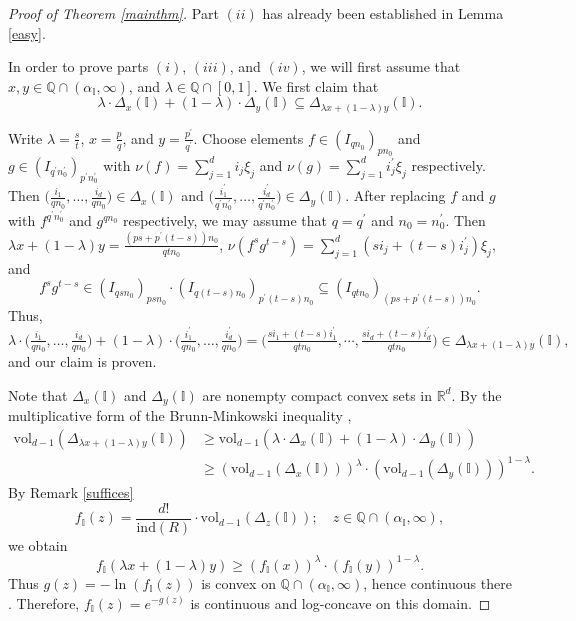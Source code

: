 \documentclass[12pt,a4paper]{amsart}
\theoremstyle{plain}
\theoremstyle{definition}
\numberwithin{equation}{theorem}
\begin{document}
\begin{proof}[Proof of Theorem \ref{mainthm}]
Part $(ii)$ has already been established in Lemma \ref{easy}.

In order to prove parts $(i)$, $(iii)$, and $(iv)$, we will first assume that $x,y\in \mathbb{Q} \cap (\alpha_{\mathbb{I}},\infty)$, and $\lambda \in \mathbb{Q}\cap [0,1]$. We first claim that $$\lambda \cdot \Delta_x(\mathbb{I}) + (1-\lambda)\cdot \Delta_y(\mathbb{I}) \subseteq \Delta_{\lambda x + (1-\lambda)y}(\mathbb{I}).$$

Write $\lambda = \tfrac{s}{t}$, $x=\tfrac{p}{q}$, and $y=\tfrac{p^{\prime}}{q^{\prime}}$. Choose elements $f\in {(I_{qn_0})}_{pn_0}$ and $g\in {(I_{q^{\prime}n_0^{\prime}})}_{p^{\prime}n_0^{\prime}}$ with $\nu(f)=\sum_{j=1}^d i_j\xi_j$ and $\nu(g)=\sum_{j=1}^d i_j^{\prime}\xi_j$ respectively. Then $\big(\tfrac{i_1}{qn_0},\ldots,\tfrac{i_d}{qn_0}\big) \in \Delta_x(\mathbb{I})$ and $\big(\tfrac{i_1^{\prime}}{q^{\prime}n_0^{\prime}},\ldots,\tfrac{i_d^{\prime}}{q^{\prime}n_0^{\prime}}\big) \in \Delta_y(\mathbb{I})$. After replacing $f$ and $g$ with $f^{q^{\prime}n_0^{\prime}}$ and $g^{qn_0}$ respectively, we may assume that $q=q^{\prime}$ and $n_0=n_0^{\prime}$. Then $\lambda x + (1-\lambda)y = \tfrac{(ps+p^{\prime}(t-s))n_0}{qtn_0}$, $\nu(f^sg^{t-s}) = \sum_{j=1}^d \left(si_j+(t-s)i_j^{\prime}\right)\xi_j$, and $$f^sg^{t-s} \in {\left(I_{qsn_0}\right)}_{psn_0}\cdot {\left(I_{q(t-s)n_0}\right)}_{p^{\prime}(t-s)n_0}\subseteq  {\left(I_{qtn_0}\right)}_{(ps+p^{\prime}(t-s))n_0}.$$
Thus,
$$\lambda\cdot\big(\tfrac{i_1}{qn_0},\ldots,\tfrac{i_d}{qn_0}\big) + (1-\lambda)\cdot\big(\tfrac{i_1^{\prime}}{qn_0},\ldots,\tfrac{i_d^{\prime}}{qn_0}\big) = \big(\tfrac{si_1+(t-s)i_1^{\prime}}{qtn_0}, \cdots, \tfrac{si_d+(t-s)i_d^{\prime}}{qtn_0}\big) \in \Delta_{\lambda x + (1-\lambda)y}(\mathbb{I}),$$ and our claim is proven.

Note that $\Delta_x(\mathbb{I})$ and $\Delta_y(\mathbb{I})$ are nonempty compact convex sets in $\mathbb{R}^d$. By the multiplicative form of the Brunn-Minkowski inequality \cite[Theorem 8.2]{Gru07},
\begin{align*}
 \mathrm{vol}_{d-1}\left(\Delta_{\lambda x + (1-\lambda)y}(\mathbb{I})\right) &\geq \mathrm{vol}_{d-1}\left(\lambda\cdot \Delta_x(\mathbb{I}) + (1-\lambda)\cdot \Delta_y(\mathbb{I})\right)\\
 &\geq {\left(\mathrm{vol}_{d-1}\left(\Delta_x(\mathbb{I})\right)\right)}^{\lambda}\cdot {\left(\mathrm{vol}_{d-1}\left(\Delta_y(\mathbb{I})\right)\right)}^{1-\lambda}.
\end{align*}
By Remark \ref{suffices} $$f_{\mathbb{I}}(z) = \frac{d!}{\mathrm{ind}(R)}\cdot \mathrm{vol}_{d-1}\left(\Delta_z(\mathbb{I})\right);\quad z\in \mathbb{Q} \cap (\alpha_{\mathbb{I}},\infty),$$ we obtain $$f_{\mathbb{I}}(\lambda x + (1-\lambda)y) \geq {\left(f_{\mathbb{I}}(x)\right)}^{\lambda}\cdot {\left(f_{\mathbb{I}}(y)\right)}^{1-\lambda}.$$ Thus $g(z) = -\ln\left(f_{\mathbb{I}}(z)\right)$ is convex on $\mathbb{Q} \cap (\alpha_{\mathbb{I}},\infty)$, hence continuous there \cite[Theorem 1.1]{Gru07}. Therefore, $f_{\mathbb{I}}(z) = e^{-g(z)}$ is continuous and log-concave on this domain.


\end{proof}
\end{document}
